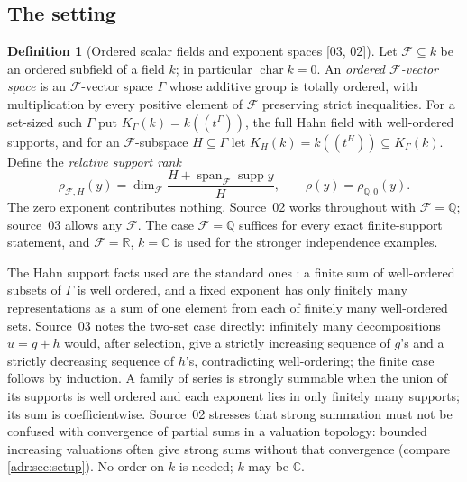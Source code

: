 \documentclass[11pt,letterpaper]{article}
\numberwithin{equation}{section}
\theoremstyle{definition}
\newtheorem{definition}[definition]{Definition}
\theoremstyle{remark}
\newcommand{\C}{\mathbb C}
\newcommand{\R}{\mathbb R}
\newcommand{\Q}{\mathbb Q}
\newcommand{\K}{K_\Gamma(k)}
\newcommand{\supp}{\operatorname{supp}}
\newcommand{\src}[1]{\textup{[#1]}}%
\begin{document}
\subsection{The setting}
\label{adr:sr:sec:setting}

\begin{definition}[Ordered scalar fields and exponent spaces \src{03, 02}]
\label{adr:sr:def:setting}
Let $\mathcal F\subseteq k$ be an ordered subfield of a field $k$; in
particular $\operatorname{char}k=0$. An \emph{ordered $\mathcal F$-vector
space} is an $\mathcal F$-vector space $\Gamma$ whose additive group is
totally ordered, with multiplication by every positive element of $\mathcal F$
preserving strict inequalities. For a set-sized such $\Gamma$ put
$\K=k((t^\Gamma))$, the full Hahn field with well-ordered supports, and for an
$\mathcal F$-subspace $H\subseteq\Gamma$ let $K_H(k)=k((t^H))\subseteq\K$.
Define the \emph{relative support rank}
\begin{equation}\label{adr:sr:eq:rank}
 \rho_{\mathcal F,H}(y)=\dim_{\mathcal F}\frac{H+\operatorname{span}_{\mathcal F}\supp y}{H},
 \qquad \rho(y)=\rho_{\Q,0}(y).
\end{equation}
The zero exponent contributes nothing. Source~02 works throughout with
$\mathcal F=\Q$; source~03 allows any $\mathcal F$. The case $\mathcal F=\Q$
suffices for every exact finite-support statement, and $\mathcal F=\R$,
$k=\C$ is used for the stronger independence examples.
\end{definition}

The Hahn support facts used are the standard ones \cite{Neumann}: a finite
sum of well-ordered subsets of $\Gamma$ is well ordered, and a fixed exponent
has only finitely many representations as a sum of one element from each of
finitely many well-ordered sets. Source~03 notes the two-set case directly:
infinitely many decompositions $u=g+h$ would, after selection, give a strictly
increasing sequence of $g$'s and a strictly decreasing sequence of $h$'s,
contradicting well-ordering; the finite case follows by induction. A family
of series is strongly summable when the union of its supports is well ordered
and each exponent lies in only finitely many supports; its sum is
coefficientwise. Source~02 stresses that strong summation must not be
confused with convergence of partial sums in a valuation topology: bounded
increasing valuations often give strong sums without that convergence
(compare \cref{adr:sec:setup}). No order on $k$ is needed; $k$ may be $\C$.
\end{document}
